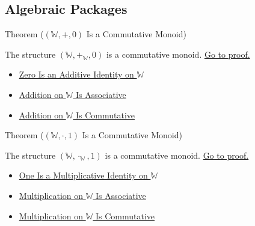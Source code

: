 \subsection*{Algebraic Packages}

\begin{theorembox}{Theorem (\texorpdfstring{$(\mathbb{W},+,0)$}{(W,+,0)} Is a Commutative Monoid)}
\begin{theorem}
\label{thm:w-additive-commutative-monoid}
The structure $(\mathbb{W},+_{\mathbb{W}},0)$ is a commutative monoid.
\hyperref[prf:w-additive-commutative-monoid]{Go to proof.}
\end{theorem}
\end{theorembox}

\begin{dependencies}
\begin{itemize}
  \item \hyperref[thm:zero-additive-identity-on-w]{Zero Is an Additive Identity on $\mathbb{W}$}
  \item \hyperref[thm:addition-on-w-associative]{Addition on $\mathbb{W}$ Is Associative}
  \item \hyperref[thm:addition-on-w-commutative]{Addition on $\mathbb{W}$ Is Commutative}
\end{itemize}
\end{dependencies}

\begin{theorembox}{Theorem (\texorpdfstring{$(\mathbb{W},\cdot,1)$}{(W,*,1)} Is a Commutative Monoid)}
\begin{theorem}
\label{thm:w-multiplicative-commutative-monoid}
The structure $(\mathbb{W},\cdot_{\mathbb{W}},1)$ is a commutative monoid.
\hyperref[prf:w-multiplicative-commutative-monoid]{Go to proof.}
\end{theorem}
\end{theorembox}

\begin{dependencies}
\begin{itemize}
  \item \hyperref[thm:one-multiplicative-identity-on-w]{One Is a Multiplicative Identity on $\mathbb{W}$}
  \item \hyperref[thm:multiplication-on-w-associative]{Multiplication on $\mathbb{W}$ Is Associative}
  \item \hyperref[thm:multiplication-on-w-commutative]{Multiplication on $\mathbb{W}$ Is Commutative}
\end{itemize}
\end{dependencies}

